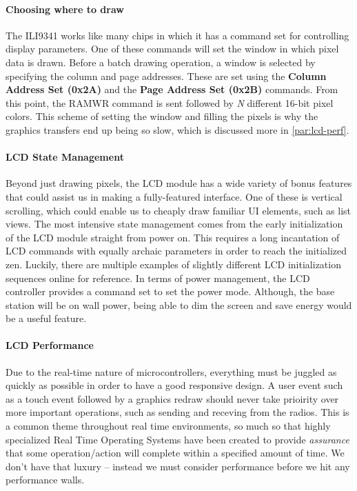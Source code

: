 \paragraph{Choosing where to draw}
The ILI9341 works like many chips in which it has a command set for controlling
display parameters. One of these commands will set the window in which pixel
data is drawn. Before a batch drawing operation, a window is selected by
specifying the column and page addresses. These are set using the
\textbf{Column Address Set (0x2A)} and the \textbf{Page Address Set (0x2B)}
commands. From this point, the RAMWR command is sent followed by \emph{N}
different 16-bit pixel colors. This scheme of setting the window and filling
the pixels is why the graphics transfers end up being so slow, which is
discussed more in \autoref{par:lcd-perf}.

\paragraph{LCD State Management}
Beyond just drawing pixels, the LCD module has a wide variety of bonus features
that could assist us in making a fully-featured interface. One of these is
vertical scrolling, which could enable us to cheaply draw familiar UI elements,
such as list views. The most intensive state management comes from the early
initialization of the LCD module straight from power on. This requires a long
incantation of LCD commands with equally archaic parameters in order to reach
the initialized zen. Luckily, there are multiple examples of slightly different
LCD initialization sequences online for reference. In terms of power
management, the LCD controller provides a command set to set the power mode.
Although, the base station will be on wall power, being able to dim the screen
and save energy would be a useful feature.

\paragraph{LCD Performance}
\label{par:lcd-perf}
Due to the real-time nature of microcontrollers, everything must be juggled as
quickly as possible in order to have a good responsive design. A user event
such as a touch event followed by a graphics redraw should never take prioirity
over more important operations, such as sending and receving from the radios.
This is a common theme
throughout real time environments, so much so that highly specialized Real Time
Operating Systems have been created to provide \emph{assurance} that some
operation/action will complete within a specified amount of time. We don't have that luxury -- instead we must consider performance before we hit any performance walls.

